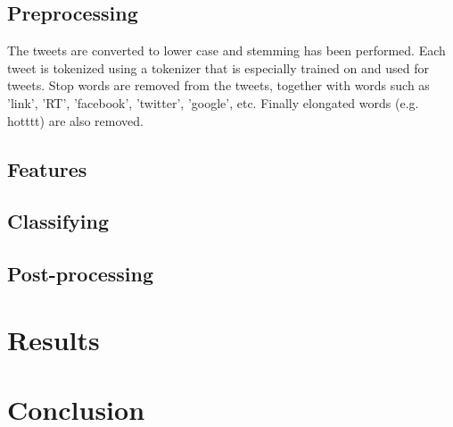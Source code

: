 \documentclass[11pt]{article}
\begin{document}
\subsection{Preprocessing}
The tweets are converted to lower case and stemming has been performed. Each tweet is tokenized using a tokenizer that is especially trained on and used for tweets. Stop words are removed from the tweets, together with words such as 'link', 'RT', 'facebook', 'twitter', 'google', etc. Finally elongated words (e.g. hotttt) are also removed.

\subsection{Features}

\subsection{Classifying}

\subsection{Post-processing}

\section{Results}

\section{Conclusion}




\newpage

\end{document}
